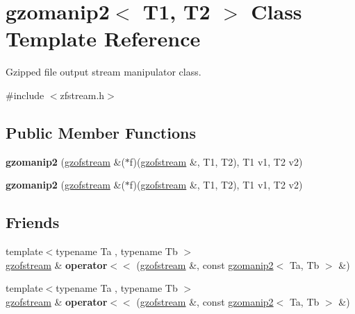 \hypertarget{classgzomanip2}{}\section{gzomanip2$<$ T1, T2 $>$ Class Template Reference}
\label{classgzomanip2}


Gzipped file output stream manipulator class.  




{\ttfamily \#include $<$zfstream.\+h$>$}

\subsection*{Public Member Functions}
\begin{DoxyCompactItemize}
\item 
\mbox{\label{classgzomanip2_a6e3980ce2fa39e29ecfa537bb8e9ddb0}} 
{\bfseries gzomanip2} (\hyperlink{classgzofstream}{gzofstream} \&($\ast$f)(\hyperlink{classgzofstream}{gzofstream} \&, T1, T2), T1 v1, T2 v2)
\item 
\mbox{\label{classgzomanip2_a6e3980ce2fa39e29ecfa537bb8e9ddb0}} 
{\bfseries gzomanip2} (\hyperlink{classgzofstream}{gzofstream} \&($\ast$f)(\hyperlink{classgzofstream}{gzofstream} \&, T1, T2), T1 v1, T2 v2)
\end{DoxyCompactItemize}
\subsection*{Friends}
\begin{DoxyCompactItemize}
\item 
\mbox{\label{classgzomanip2_a2382d2b86b2af773d17c2bc349fddb4f}} 
{\footnotesize template$<$typename Ta , typename Tb $>$ }\\\hyperlink{classgzofstream}{gzofstream} \& {\bfseries operator$<$$<$} (\hyperlink{classgzofstream}{gzofstream} \&, const \hyperlink{classgzomanip2}{gzomanip2}$<$ Ta, Tb $>$ \&)
\item 
\mbox{\label{classgzomanip2_a2382d2b86b2af773d17c2bc349fddb4f}} 
{\footnotesize template$<$typename Ta , typename Tb $>$ }\\\hyperlink{classgzofstream}{gzofstream} \& {\bfseries operator$<$$<$} (\hyperlink{classgzofstream}{gzofstream} \&, const \hyperlink{classgzomanip2}{gzomanip2}$<$ Ta, Tb $>$ \&)
\end{DoxyCompactItemize}


